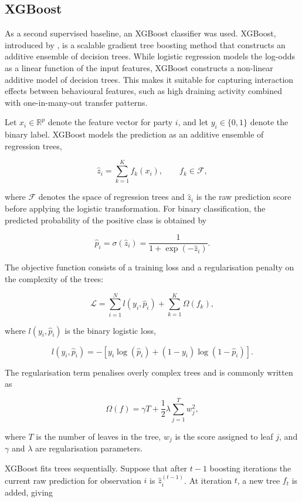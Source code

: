\subsection{XGBoost}
As a second supervised baseline, an XGBoost classifier was used. XGBoost, introduced by \cite{Chen_2016}, is a scalable gradient tree boosting method that constructs an additive ensemble of decision trees. While logistic
regression models the log-odds as a linear function of the input features, XGBoost
constructs a non-linear additive model of decision trees. This makes it suitable for
capturing interaction effects between behavioural features, such as high draining
activity combined with one-in-many-out transfer patterns.

Let \(x_i \in \mathbb{R}^{p}\) denote the feature vector for party \(i\), and let
\(y_i \in \{0,1\}\) denote the binary label. XGBoost models the prediction as an
additive ensemble of regression trees,

\[
\hat{z}_i
=
\sum_{k=1}^{K} f_k(x_i),
\qquad
f_k \in \mathcal{F},
\]

where \(\mathcal{F}\) denotes the space of regression trees and \(\hat{z}_i\) is the
raw prediction score before applying the logistic transformation. For binary
classification, the predicted probability of the positive class is obtained by

\[
\hat{p}_i
=
\sigma(\hat{z}_i)
=
\frac{1}{1+\exp(-\hat{z}_i)}.
\]

The objective function consists of a training loss and a regularisation penalty on
the complexity of the trees:

\[
\mathcal{L}
=
\sum_{i=1}^{N}
l(y_i,\hat{p}_i)
+
\sum_{k=1}^{K}
\Omega(f_k),
\]

where \(l(y_i,\hat{p}_i)\) is the binary logistic loss,

\[
l(y_i,\hat{p}_i)
=
-
\left[
y_i\log(\hat{p}_i)
+
(1-y_i)\log(1-\hat{p}_i)
\right].
\]

The regularisation term penalises overly complex trees and is commonly written as

\[
\Omega(f)
=
\gamma T
+
\frac{1}{2}\lambda
\sum_{j=1}^{T}
w_j^2,
\]

where \(T\) is the number of leaves in the tree, \(w_j\) is the score assigned to
leaf \(j\), and \(\gamma\) and \(\lambda\) are regularisation parameters.

XGBoost fits trees sequentially. Suppose that after \(t-1\) boosting iterations the
current raw prediction for observation \(i\) is \(\hat{z}_i^{(t-1)}\). At iteration
\(t\), a new tree \(f_t\) is added, giving


